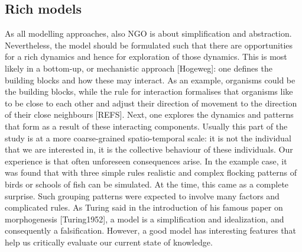 \subsection{Rich models}

As all modelling approaches, also NGO is about simplification and abstraction. Nevertheless, the model should be formulated such that there are opportunities for a rich dynamics and hence for exploration of those dynamics. This is most likely in a bottom-up, or mechanistic approach [Hogeweg]: one defines the building blocks and how these may interact. As an example, organisms could be the building blocks, while the rule for interaction formalises that organisms like to be close to each other and adjust their direction of movement to the direction of their close neighbours [REFS]. Next, one explores the dynamics and patterns that form as a result of these interacting components. Usually this part of the study is at a more coarse-grained spatio-temporal scale: it is not the individual that we are interested in, it is the collective behaviour of these individuals. Our experience is that often unforeseen consequences arise. In the example case, it was found that with three simple rules realistic and complex flocking patterns of birds or schools of fish can be simulated. At the time, this came as a complete surprise. Such grouping patterns were expected to involve many factors and complicated rules. As Turing said in the introduction of his famous paper on morphogenesis [Turing1952], a model is a simplification and idealization, and consequently a falsification. However, a good model has interesting features that help us critically evaluate our current state of knowledge.